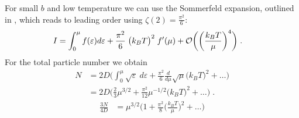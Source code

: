 %
For small $b$ and low temperature we can use the Sommerfeld expansion, outlined in ,
%
%
which reads to leading order using $\zeta(2) = \frac{\pi^2}{6}$:
%
\begin{align*}
I &= \int_{0}^{\mu} f(\varepsilon) d\varepsilon +  \frac{\pi^{2}}{6}\;\big(k_{B}T\big)^{2} \;f'(\mu)+ {\cal O}\bigg(\bigg(\frac{k_{B}T}{\mu}\bigg)^{4}\bigg)\;.
\end{align*}
%
For the total particle number we obtain
\begin{align*}
N&=2 D \bigg(\int_{0}^{\mu}\sqrt{\varepsilon} ~d\varepsilon
+\frac{\pi^{2}}{6}\frac{d}{d\mu}\sqrt{\mu}\bigg( k_{B}T \bigg)^{2}+\ldots\bigg)\\
&=2 D \bigg(\frac{2}{3}\mu^{3/2} 
+\frac{\pi^{2}}{12}\mu^{-1/2}\big( k_{B}T \big)^{2}+\ldots
\bigg)\;.
\end{align*}
%
%
\begin{align}\label{eq:spin:para:aux2}
\frac{3 N}{4 D}&= \mu^{3/2}\bigg(1
+\frac{\pi^{2}}{8}\bigg(\frac{ k_{B}T }{\mu}\bigg)^{2}+\ldots
\bigg)
\end{align}
%

